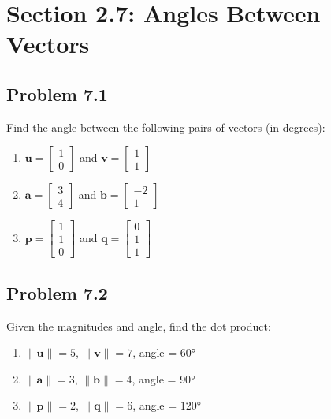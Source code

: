 \documentclass{article}
\begin{document}
\section{Section 2.7: Angles Between Vectors}

\subsection{Problem 7.1}
Find the angle between the following pairs of vectors (in degrees):
\begin{enumerate}
\item $\mathbf{u} = \begin{bmatrix} 1 \\ 0 \end{bmatrix}$ and $\mathbf{v} = \begin{bmatrix} 1 \\ 1 \end{bmatrix}$
\item $\mathbf{a} = \begin{bmatrix} 3 \\ 4 \end{bmatrix}$ and $\mathbf{b} = \begin{bmatrix} -2 \\ 1 \end{bmatrix}$
\item $\mathbf{p} = \begin{bmatrix} 1 \\ 1 \\ 0 \end{bmatrix}$ and $\mathbf{q} = \begin{bmatrix} 0 \\ 1 \\ 1 \end{bmatrix}$
\end{enumerate}

\subsection{Problem 7.2}
Given the magnitudes and angle, find the dot product:
\begin{enumerate}
\item $\|\mathbf{u}\| = 5$, $\|\mathbf{v}\| = 7$, angle = $60°$
\item $\|\mathbf{a}\| = 3$, $\|\mathbf{b}\| = 4$, angle = $90°$
\item $\|\mathbf{p}\| = 2$, $\|\mathbf{q}\| = 6$, angle = $120°$
\end{enumerate}
\end{document}
